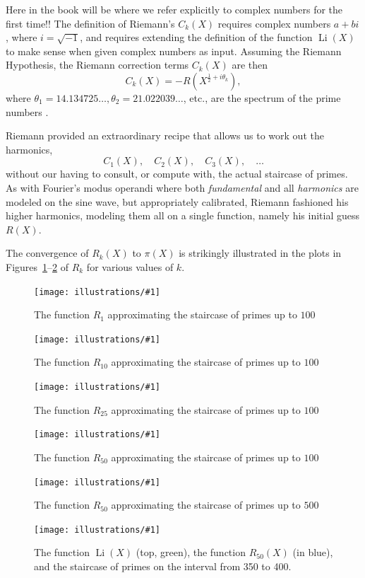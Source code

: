 \documentclass[openany]{book}
\DeclareMathOperator{\Li}{Li}
\newcommand{\ill}[3]{%
   \begin{figure}[H]%
   \vspace{-2ex}
   \centering%
   \texttt{[image: illustrations/\#1]}%
   \caption{#3}%
   \vspace{-2ex}
    \end{figure}}
\theoremstyle{plain}
\theoremstyle{definition}
\newcommand{\RH}{Riemann Hypothesis\index{Riemann Hypothesis}}
\begin{document}
Here in the book will be where we refer explicitly to complex numbers
for the first time!!  The definition of Riemann's $C_k(X)$ requires
complex numbers $a+bi$, where $i=\sqrt{-1}$, and requires extending
the definition of the function $\Li(X)$ to make sense when given
complex numbers as input.  Assuming the \RH{}, the Riemann correction
terms $C_k(X)$ are then
$$
   C_k(X)= -R(X^{\frac{1}{2} + i\theta_k}),
$$
where $\theta_1 = 14.134725\dots, \theta_2 = 21.022039\dots$, etc.,
are the spectrum of the prime numbers .

Riemann provided an extraordinary recipe that allows us to work
out the harmonics, $$C_1(X),\quad C_2(X),\quad C_3(X),\quad \dots$$ without our having
to consult, or compute with, the actual staircase of primes. As with
Fourier's modus operandi where both {\em fundamental} and all {\em
  harmonics} are modeled on the sine wave, but appropriately
calibrated, Riemann fashioned his higher harmonics, modeling them all
on a single function, namely his initial guess $R(X)$.

The convergence of $R_k(X)$ to $\pi(X)$ is strikingly illustrated
in the plots in Figures~\ref{fig:rkfirst}--\ref{fig:rklast} of $R_k$ for various values of $k$.


\ill{Rk_1_2_100}{.9}{The function $R_{1}$ approximating the staircase of primes up to $100$\label{fig:rkfirst}}

\ill{Rk_10_2_100}{.9}{The function $R_{10}$ approximating the staircase of primes up to $100$}

\ill{Rk_25_2_100}{.9}{The function $R_{25}$ approximating the staircase of primes up to $100$}

\ill{Rk_50_2_100}{.9}{The function $R_{50}$ approximating the staircase of primes up to $100$}


\ill{Rk_50_2_500}{.9}{The function $R_{50}$ approximating the staircase of primes up to $500$}

\ill{Rk_50_350_400}{.9}{The function $\Li(X)$ (top, green), the function $R_{50}(X)$ (in blue), and the staircase of primes on the interval from 350 to 400.\label{fig:rklast}}
\end{document}
